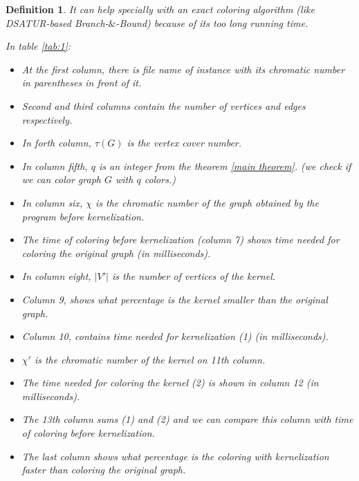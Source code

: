 \documentclass[12pt]{article}
\theoremstyle{slplain}
\newtheorem{defi}{Definition}
\begin{document}
\begin{defi}
It can help specially with an exact coloring algorithm (like DSATUR-based Branch-$\&$-Bound) because of its too long running time.



In table \ref{tab:1}:

\begin{itemize}
\item At the first column, there is file name of instance with its chromatic number in parentheses in front of it.

\item Second and third columns contain the number of vertices and edges respectively. 

\item In forth column, $\tau(G)$ is the vertex cover number.

\item In column fifth, $q$ is an integer from the theorem \ref{main theorem}. (we check if we can color graph $G$ with $q$ colors.) 
\item In column six, $\chi$ is the chromatic number of the graph obtained by the program before kernelization.

\item The time of coloring before kernelization (column 7) shows time needed for coloring the original graph (in milliseconds).

\item In column eight, $|V'|$ is the number of vertices of the kernel. 

\item Column 9, shows what percentage is the kernel smaller than the original graph.

\item Column 10, contains time needed for kernelization (1) (in milliseconds).

\item $\chi'$ is the chromatic number of the kernel on 11th column. 

\item The time needed for coloring the kernel (2) is shown in column 12 (in milliseconds). 

\item The 13th column sums (1) and (2) and we can compare this column with time of coloring before kernelization.

\item The last column shows what percentage is the coloring with kernelization faster than coloring the original graph.
\end{itemize}


\end{defi}
\end{document}
